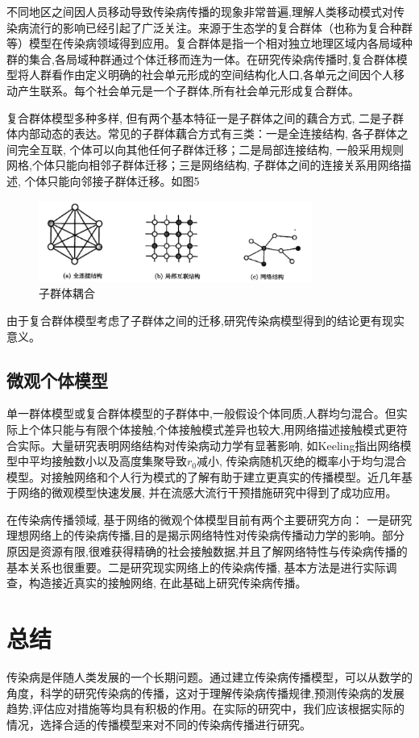 \documentclass[12pt]{report}
\begin{document}
		不同地区之间因人员移动导致传染病传播的现象非常普遍,理解人类移动模式对传染病流行的影响已经引起了广泛关注。来源于生态学的复合群体（也称为复合种群等）模型在传染病领域得到应用。复合群体是指一个相对独立地理区域内各局域种群的集合,各局域种群通过个体迁移而连为一体。在研究传染病传播时,复合群体模型将人群看作由定义明确的社会单元形成的空间结构化人口,各单元之间因个人移动产生联系。每个社会单元是一个子群体,所有社会单元形成复合群体。
		\par\setlength\parindent{2em}复合群体模型多种多样, 但有两个基本特征一是子群体之间的藕合方式, 二是子群体内部动态的表达。常见的子群体藕合方式有三类：一是全连接结构, 各子群体之间完全互联, 个体可以向其他任何子群体迁移；二是局部连接结构, 一般采用规则网格,个体只能向相邻子群体迁移；三是网络结构, 子群体之间的连接关系用网络描述, 个体只能向邻接子群体迁移。如图5
     \begin{figure}
			\centering
			\includegraphics[width=0.8\textwidth]{img/ziqunti.png}
			\caption{子群体耦合} 
			\label{img}
		\end{figure}	
		\par\setlength\parindent{2em}由于复合群体模型考虑了子群体之间的迁移,研究传染病模型得到的结论更有现实意义。
		
		
		\subsection{微观个体模型}
		
		单一群体模型或复合群体模型的子群体中,一般假设个体同质,人群均匀混合。但实际上个体只能与有限个体接触,个体接触模式差异也较大,用网络描述接触模式更符合实际。大量研究表明网络结构对传染病动力学有显著影响, 如Keeling指出网络模型中平均接触数小以及高度集聚导致$r_0$减小, 传染病随机灭绝的概率小于均匀混合模型。对接触网络和个人行为模式的了解有助于建立更真实的传播模型。近几年基于网络的微观模型快速发展, 并在流感大流行干预措施研究中得到了成功应用。
		\par\setlength\parindent{2em}在传染病传播领域, 基于网络的微观个体模型目前有两个主要研究方向： 一是研究理想网络上的传染病传播,目的是揭示网络特性对传染病传播动力学的影响。部分原因是资源有限,很难获得精确的社会接触数据,并且了解网络特性与传染病传播的基本关系也很重要。二是研究现实网络上的传染病传播, 基本方法是进行实际调查，构造接近真实的接触网络, 在此基础上研究传染病传播。
		
		
		\section{总结}
		
		传染病是伴随人类发展的一个长期问题。通过建立传染病传播模型，可以从数学的角度，科学的研究传染病的传播，这对于理解传染病传播规律,预测传染病的发展趋势,评估应对措施等均具有积极的作用。在实际的研究中，我们应该根据实际的情况，选择合适的传播模型来对不同的传染病传播进行研究。
		
		
			
	
\end{document}
